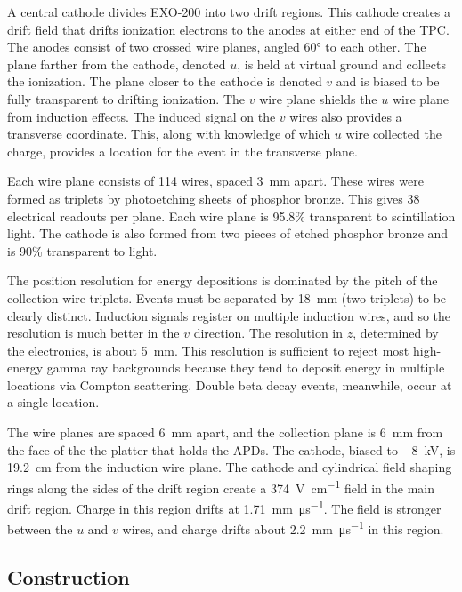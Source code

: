 \documentclass[herrin-thesis.tex]{subfiles}
\begin{document}
A central cathode divides EXO-200 into two drift regions. This cathode creates a drift field that drifts ionization electrons to the anodes at either end of the TPC. The anodes consist of two crossed wire planes, angled \ang{60} to each other. The plane farther from the cathode, denoted \(u\), is held at virtual ground and collects the ionization. The plane closer to the cathode is denoted \(v\) and is biased to be fully transparent to drifting ionization. The \(v\) wire plane shields the \(u\) wire plane from induction effects. The induced signal on the \(v\) wires also provides a transverse coordinate. This, along with knowledge of which \(u\) wire collected the charge, provides a location for the event in the transverse plane.

Each wire plane consists of 114 wires, spaced \SI{3}{\mm} apart. These wires were formed as triplets by photoetching sheets of phosphor bronze. This gives 38 electrical readouts per plane. Each wire plane is 95.8\% transparent to scintillation light. The cathode is also formed from two pieces of etched phosphor bronze and is 90\% transparent to light.

The position resolution for energy depositions is dominated by the pitch of the collection wire triplets. Events must be separated by \SI{18}{\mm} (two triplets) to be clearly distinct. Induction signals register on multiple induction wires, and so the resolution is much better in the \(v\) direction. The resolution in \(z\), determined by the electronics, is about \SI{5}{\mm}. This resolution is sufficient to reject most high-energy gamma ray backgrounds because they tend to deposit energy in multiple locations via Compton scattering. Double beta decay events, meanwhile, occur at a single location.

The wire planes are spaced \SI{6}{\mm} apart, and the collection plane is \SI{6}{\mm} from the face of the the platter that holds the APDs. The cathode, biased to \SI{-8}{\kV}, is \SI{19.2}{\cm} from the induction wire plane. The cathode and cylindrical field shaping rings along the sides of the drift region create a \SI{374}{\V\per\cm} field in the main drift region. Charge in this region drifts at \SI{1.71}{\mm\per\micro\s}. The field is stronger between the \(u\) and \(v\) wires, and charge drifts about \SI{2.2}{\mm\per\micro\s} in this region.

\subsection{Construction}
\end{document}
